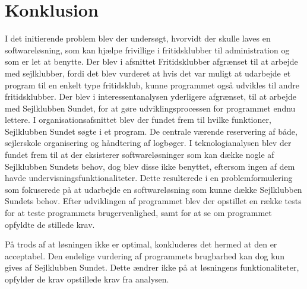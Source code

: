 \chapter{Konklusion}
I det initierende problem blev der undersøgt, hvorvidt der skulle laves en softwareløsning, som kan hjælpe frivillige i fritidsklubber til administration og som er let at benytte. 
Der blev i afsnittet Fritidsklubber afgrænset til at arbejde med sejlklubber, fordi det blev vurderet at hvis det var muligt at udarbejde et program til en enkelt type fritidsklub, kunne programmet også udvikles til andre fritidsklubber. 
Der blev i interessentanalysen yderligere afgrænset, til at arbejde med Sejlklubben Sundet, for at gøre udviklingsprocessen for programmet endnu lettere.
I organisationsafsnittet blev der fundet frem til hvilke funktioner, Sejlklubben Sundet søgte i et program.
De centrale værende reservering af både, sejlerskole organisering og håndtering af logbøger.
I teknologianalysen blev der fundet frem til at der eksisterer softwareløsninger som kan dække nogle af Sejlklubben Sundets behov, dog blev disse ikke benyttet, eftersom ingen af dem havde undervisningsfunktionaliteter. 
Dette resulterede i en problemformulering som fokuserede på at udarbejde en softwareløsning som kunne dække Sejlklubben Sundets behov. 
Efter udviklingen af programmet blev der opstillet en række tests for at teste programmets brugervenlighed, samt for at se om programmet opfyldte de stillede krav.

På trods af at løsningen ikke er optimal, konkluderes det hermed at den er acceptabel. 
Den endelige vurdering af programmets brugbarhed kan dog kun gives af Sejlklubben Sundet.
Dette ændrer ikke på at løsningens funktionaliteter, opfylder de krav opstillede krav fra analysen. 

